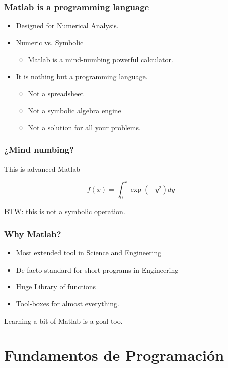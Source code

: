 \documentclass[12pt]{beamer}
\begin{document}
\begin{frame}
  \frametitle{Matlab is a programming language}
  \begin{itemize}
  \item Designed for Numerical Analysis.
  \item Numeric vs. Symbolic
    \begin{itemize}
    \item Matlab is a mind-numbing powerful calculator.
    \end{itemize}
  \item It is nothing but a programming language.
    \begin{itemize}
    \item Not a spreadsheet
    \item Not a symbolic algebra engine
    \item Not a solution for all your problems.
    \end{itemize}
  \end{itemize}
\end{frame}

\begin{frame}
  \frametitle{¿Mind numbing?}
This is advanced Matlab

\[ f(x) = \int_0^x \exp(-y^2) dy \]

\testcode

BTW: this is not a symbolic operation.
\end{frame}

\begin{frame}
  \frametitle{Why Matlab?}

  \begin{itemize}
  \item Most extended tool in Science and Engineering
  \item De-facto standard for short programs in Engineering
  \item Huge Library of functions
  \item Tool-boxes for almost everything.
  \end{itemize}

  Learning a bit of Matlab is a goal too.
\end{frame}

\section{Fundamentos de Programación}
\end{document}

